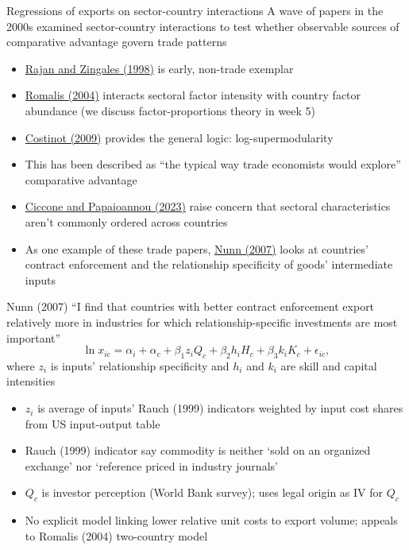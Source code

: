 \documentclass[11pt,notes=hide,aspectratio=169]{beamer}
\begin{document}
\begin{frame}{Regressions of exports on sector-country interactions}
A wave of papers in the 2000s examined sector-country interactions to test 
whether observable sources of comparative advantage govern trade patterns
\begin{itemize}
	\item \href{https://ideas.repec.org/a/aea/aecrev/v88y1998i3p559-86.html}{Rajan and Zingales (1998)} is early, non-trade exemplar
	\item \href{https://www.aeaweb.org/articles?id=10.1257/000282804322970715}{Romalis (2004)} interacts sectoral factor intensity with country factor abundance (we discuss factor-proportions theory in week 5)
	\item \href{https://doi.org/10.3982/ECTA7636}{Costinot (2009)} provides the general logic: log-supermodularity
	\item This has been described as ``the typical way trade economists would explore'' comparative advantage
	\item \href{https://doi.org/10.1093/ej/ueac047}{Ciccone and Papaioannou (2023)} raise concern that sectoral characteristics aren't commonly ordered across countries
	\item As one example of these trade papers, \href{https://academic.oup.com/qje/article/122/2/569/1942086}{Nunn (2007)} looks at countries' contract enforcement and the relationship specificity of goods' intermediate inputs
\end{itemize}
%
\end{frame}
\begin{frame}{Nunn (2007)}
``I find that countries with better contract enforcement export relatively more in industries for which relationship-specific investments are most important''
\begin{equation*}
\ln x_{ic} = 
\alpha_i + \alpha_c 
+ \beta_1 z_i Q_c + \beta_2 h_i H_c + \beta_3 k_i K_c 
+ \epsilon_{ic},
\end{equation*}
{\small where $z_i$ is inputs' relationship specificity and $h_i$ and $k_i$ are skill and capital intensities}
\begin{itemize}
	\item $z_i$ is average of inputs' Rauch (1999) indicators weighted by input cost shares from US input-output table
	\item Rauch (1999) indicator say commodity is neither `sold on an organized exchange' nor `reference priced in industry journals'
	\item $Q_c$ is investor perception (World Bank survey); uses legal origin as IV for $Q_c$
	\item No explicit model linking lower relative unit costs to export volume; appeals to Romalis (2004) two-country model
\end{itemize}
\end{frame}
\end{document}
